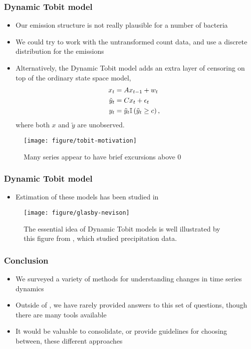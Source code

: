 \documentclass{beamer}
\begin{document}
\begin{frame}
  \frametitle{Dynamic Tobit model}
 \begin{itemize}
 \item Our emission structure is not really plausible for a number of bacteria
 \item We could try to work with the untransformed count data, and use a
   discrete distribution for the emissions
  \item Alternatively, the Dynamic Tobit model adds an extra layer of censoring
    on top of the ordinary state space model,
    \begin{align*}
      x_{t} &= Ax_{t - 1} + w_{t} \\
      \tilde{y}_{t} &= Cx_{t} + \epsilon_{t} \\
      y_{t} &= \tilde{y}_{t} \mathbb{I}\left({\tilde{y}_{t} \geq c}\right),
    \end{align*}
    where both $x$ and $\tilde{y}$ are unobserved.
 \end{itemize} 
\begin{figure}[ht]
  \centering
  \texttt{[image: figure/tobit-motivation]}
  \caption{Many series appear to have brief excursions above 0 \label{fig:label}}
\end{figure}
\end{frame}

\begin{frame}
  \frametitle{Dynamic Tobit model}
  \begin{itemize}
  \item Estimation of these models has been studied in \citep{chib1992bayes,
    manrique1998simulation, andrieu2002particle}
  \end{itemize}
 \begin{figure}[ht]
   \centering
   \texttt{[image: figure/glasby-nevison]}
   \caption{The essential idea of Dynamic Tobit models is well illustrated by
     this figure from \citep{glasbey1997rainfall}, which studied precipitation
     data. \label{fig:glasby-nevison}}
 \end{figure}
\end{frame}

\begin{frame}
  \frametitle{Conclusion}
 \begin{itemize}
 \item We surveyed a variety of methods for understanding changes in time series
   dynamics
\item Outside of \citep{digiulio2015temporal}, we have rarely provided answers to this
  set of questions, though there are many tools available
\item It would be valuable to consolidate, or provide guidelines for choosing
  between, these different approaches

 \end{itemize} 
\end{frame} 


 
\end{document}
